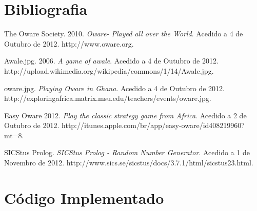 \documentclass[15pt,a4paper]{article}
\begin{document}
\section{Bibliografia}
\begin{thebibliography}{9}

  The Oware Society.
  2010.
  \emph{ Oware- Played all over the World}.
  Acedido a 4 de Outubro de 2012.
  http://www.oware.org.
  
  Awale.jpg.
  2006.
  \emph{A game of awale}.
  Acedido a 4 de Outubro de 2012.
  http://upload.wikimedia.org/wikipedia/commons/1/14/Awale.jpg.
  
	oware.jpg.
  \emph{Playing Oware in Ghana}.
  Acedido a 4 de Outubro de 2012.
  http://exploringafrica.matrix.msu.edu/teachers/events/oware.jpg.
  
	Easy Oware
	2012.
  \emph{Play the classic strategy game from Africa}.
  Acedido a 2 de Outubro de 2012.
  http://itunes.apple.com/br/app/easy-oware/id408219960?mt=8.
  
  SICStus Prolog.
  \emph{SICStus Prolog - Random Number Generator}.
    Acedido a 1 de Novembro de 2012.
  http://www.sics.se/sicstus/docs/3.7.1/html/sicstus\textunderscore23.html.

\end{thebibliography}

\newpage
\appendix
\section{Código Implementado}
 \begin{verbatim}
\end{verbatim}
\end{document}
